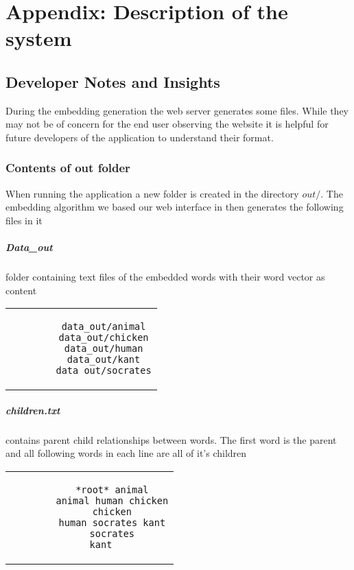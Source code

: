 \chapter{Appendix: Description of the system}

\section{Developer Notes and Insights}
During the embedding generation the web server generates some files. While they may not be of concern for the end user observing the website it is helpful for future developers of the application to understand their format.

\subsection{Contents of out folder}
When running the application a new folder is created in the directory $out/$. The embedding algorithm we based our web interface in then generates the following files in it
\paragraph{Data\_out} folder containing text files of the embedded words with their word vector as content
\begin{center}
	
	\begin{tabular}{c}
		\begin{lstlisting}
		data_out/animal
		data_out/chicken
		data_out/human
		data_out/kant
		data_out/socrates
		\end{lstlisting}
	\end{tabular}
\end{center}

\paragraph{children.txt} contains parent child relationships between words. The first word is the parent and all following words in each line are all of it's children
\begin{center}
	\begin{tabular}{c}
		\begin{lstlisting}
		*root* animal
		animal human chicken
		chicken
		human socrates kant
		socrates
		kant	
		\end{lstlisting}
	\end{tabular}
\end{center}

